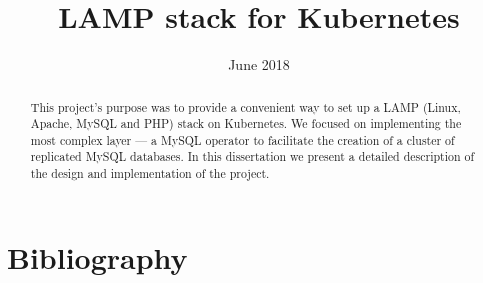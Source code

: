 \documentclass[licencjacka,en]{pracamgr}
\title{LAMP stack for Kubernetes}
\date{June 2018}
\begin{document}
  \maketitle

  \begin{abstract}
  This project's purpose was to provide a convenient way to set up a LAMP (Linux, Apache, MySQL and PHP)
  stack on Kubernetes. We focused on implementing the most complex layer
  --- a MySQL operator to facilitate the creation of a cluster of replicated
  MySQL databases. In this dissertation we present a detailed description of
  the design and implementation of the project.
  \end{abstract}

  \tableofcontents

  
  
  
  
  
  
  
  

  \chapter*{Bibliography}
  \printbibliography[heading=none]
\end{document}
